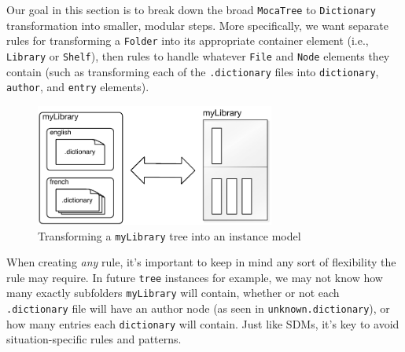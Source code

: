 Our goal in this section is to break down the broad \texttt{MocaTree} to \texttt{Dictionary} transformation into smaller, modular steps. More specifically, we
want separate rules for transforming a \texttt{Folder} into its appropriate container element (i.e., \texttt{Library} or \texttt{Shelf}), then rules to
handle whatever \texttt{File} and \texttt{Node} elements they contain (such as transforming each of the \texttt{.dictionary} files into
\texttt{dictionary}, \texttt{author}, and \texttt{entry} elements).

\vspace{0.5cm}

\begin{figure}[htp]
\begin{center}
  \includegraphics[width=0.7\textwidth]{treeToDictionaryTransformation}
  \caption{Transforming a \texttt{myLibrary} tree into an instance model}
  \label{fig:treeToDictionary}
\end{center}
\end{figure}

\vspace{0.5cm}

When creating \emph{any} rule, it's important to keep in mind any sort of flexibility the rule may require. In future \texttt{tree} instances for example, we
may not know how many exactly subfolders \texttt{myLibrary} will contain, whether or not each \texttt{.dictionary} file will have an author node (as seen in
\texttt{unknown.dictionary}), or how many entries each \texttt{dictionary} will contain. Just like SDMs, it's key to avoid situation-specific rules and
patterns.

